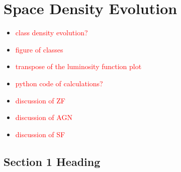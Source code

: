 \chapter{Space Density Evolution}
\thispagestyle{empty}

\begin{itemize}
    \item \textcolor{red}{class density evolution?}
    \item \textcolor{red}{figure of classes}
    \item \textcolor{red}{transpose of the luminosity function plot}
    \item \textcolor{red}{python code of calculations?}
    \item \textcolor{red}{discussion of ZF}
    \item \textcolor{red}{discussion of AGN}
    \item \textcolor{red}{discussion of SF}
\end{itemize}

\section{Section 1 Heading}
\lipsum[1]